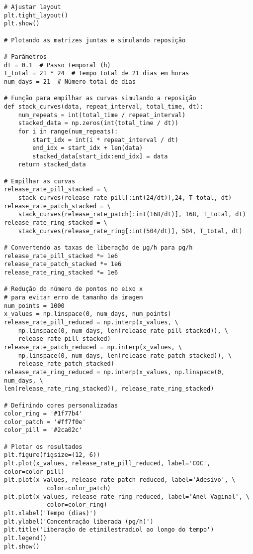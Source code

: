 \begin{verbatim}
# Ajustar layout
plt.tight_layout()
plt.show()

# Plotando as matrizes juntas e simulando reposição

# Parâmetros
dt = 0.1  # Passo temporal (h)
T_total = 21 * 24  # Tempo total de 21 dias em horas
num_days = 21  # Número total de dias

# Função para empilhar as curvas simulando a reposição
def stack_curves(data, repeat_interval, total_time, dt):
    num_repeats = int(total_time / repeat_interval)
    stacked_data = np.zeros(int(total_time / dt))
    for i in range(num_repeats):
        start_idx = int(i * repeat_interval / dt)
        end_idx = start_idx + len(data)
        stacked_data[start_idx:end_idx] = data
    return stacked_data

# Empilhar as curvas
release_rate_pill_stacked = \
    stack_curves(release_rate_pill[:int(24/dt)],24, T_total, dt)
release_rate_patch_stacked = \
    stack_curves(release_rate_patch[:int(168/dt)], 168, T_total, dt)
release_rate_ring_stacked = \
    stack_curves(release_rate_ring[:int(504/dt)], 504, T_total, dt)

# Convertendo as taxas de liberação de µg/h para pg/h
release_rate_pill_stacked *= 1e6
release_rate_patch_stacked *= 1e6
release_rate_ring_stacked *= 1e6

# Redução do número de pontos no eixo x 
# para evitar erro de tamanho da imagem
num_points = 1000
x_values = np.linspace(0, num_days, num_points)
release_rate_pill_reduced = np.interp(x_values, \
    np.linspace(0, num_days, len(release_rate_pill_stacked)), \
    release_rate_pill_stacked)
release_rate_patch_reduced = np.interp(x_values, \
    np.linspace(0, num_days, len(release_rate_patch_stacked)), \
    release_rate_patch_stacked)
release_rate_ring_reduced = np.interp(x_values, np.linspace(0, num_days, \
len(release_rate_ring_stacked)), release_rate_ring_stacked)

# Definindo cores personalizadas
color_ring = '#1f77b4'
color_patch = '#ff7f0e'
color_pill = '#2ca02c'

# Plotar os resultados
plt.figure(figsize=(12, 6))
plt.plot(x_values, release_rate_pill_reduced, label='COC', color=color_pill)
plt.plot(x_values, release_rate_patch_reduced, label='Adesivo', \
            color=color_patch)
plt.plot(x_values, release_rate_ring_reduced, label='Anel Vaginal', \
            color=color_ring)
plt.xlabel('Tempo (dias)')
plt.ylabel('Concentração liberada (pg/h)')
plt.title('Liberação de etinilestradiol ao longo do tempo')
plt.legend()
plt.show()
\end{verbatim}